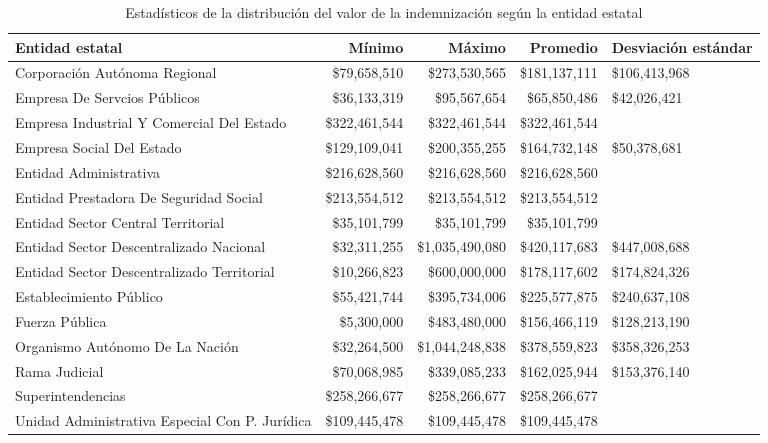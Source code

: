 \begin{table}[htbp]
\centering
\caption{Estadísticos de la distribución del
valor de la indemnización según la entidad estatal} 
\label{tab:indemnizacion-entidad}
\begin{tabular}{lrrrR{2cm}}
  \hline
Entidad estatal & Mínimo & Máximo & Promedio & Desviación estándar \\ 
  \hline
Corporación Autónoma Regional & \$79,658,510 & \$273,530,565 & \$181,137,111 & \$106,413,968 \\ 
  Empresa De Servcios Públicos & \$36,133,319 & \$95,567,654 & \$65,850,486 & \$42,026,421 \\ 
  Empresa Industrial Y Comercial Del Estado & \$322,461,544 & \$322,461,544 & \$322,461,544 &  \\ 
  Empresa Social Del Estado & \$129,109,041 & \$200,355,255 & \$164,732,148 & \$50,378,681 \\ 
  Entidad Administrativa & \$216,628,560 & \$216,628,560 & \$216,628,560 &  \\ 
  Entidad Prestadora De Seguridad Social & \$213,554,512 & \$213,554,512 & \$213,554,512 &  \\ 
  Entidad Sector Central Territorial & \$35,101,799 & \$35,101,799 & \$35,101,799 &  \\ 
  Entidad Sector Descentralizado Nacional & \$32,311,255 & \$1,035,490,080 & \$420,117,683 & \$447,008,688 \\ 
  Entidad Sector Descentralizado Territorial & \$10,266,823 & \$600,000,000 & \$178,117,602 & \$174,824,326 \\ 
  Establecimiento Público & \$55,421,744 & \$395,734,006 & \$225,577,875 & \$240,637,108 \\ 
  Fuerza Pública & \$5,300,000 & \$483,480,000 & \$156,466,119 & \$128,213,190 \\ 
  Organismo Autónomo De La Nación & \$32,264,500 & \$1,044,248,838 & \$378,559,823 & \$358,326,253 \\ 
  Rama Judicial & \$70,068,985 & \$339,085,233 & \$162,025,944 & \$153,376,140 \\ 
  Superintendencias & \$258,266,677 & \$258,266,677 & \$258,266,677 &  \\ 
  Unidad Administrativa Especial Con P. Jurídica & \$109,445,478 & \$109,445,478 & \$109,445,478 &  \\ 
   \hline
\end{tabular}
\end{table}
